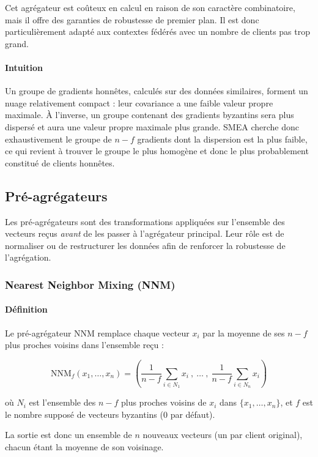 \documentclass[a4paper,11pt]{article}
\begin{document}
Cet agrégateur est coûteux en calcul en raison de son caractère combinatoire, mais il offre des garanties de robustesse de premier plan. Il est donc particulièrement adapté aux contextes fédérés avec un nombre de clients pas trop grand.

\paragraph{Intuition}

Un groupe de gradients honnêtes, calculés sur des données similaires, forment un nuage relativement compact : leur covariance a une faible valeur propre maximale. À l'inverse, un groupe contenant des gradients byzantins sera plus dispersé et aura une valeur propre maximale plus grande. SMEA cherche donc exhaustivement le groupe de $n-f$ gradients dont la dispersion est la plus faible, ce qui revient à trouver le groupe le plus homogène et donc le plus probablement constitué de clients honnêtes.

\subsection{Pré-agrégateurs}

Les pré-agrégateurs sont des transformations appliquées sur l'ensemble des vecteurs reçus \emph{avant} de les passer à l'agrégateur principal. Leur rôle est de normaliser ou de restructurer les données afin de renforcer la robustesse de l'agrégation.

\subsubsection{Nearest Neighbor Mixing (NNM)}

\paragraph{Définition}

Le pré-agrégateur NNM remplace chaque vecteur $x_i$ par la moyenne de ses $n-f$ plus proches voisins dans l'ensemble reçu :

\[
\mathrm{NNM}_f(x_1,\dots,x_n)
=
\left(
\frac{1}{n-f}\sum_{i \in N_1} x_i
\ , \ \dots \ , \
\frac{1}{n-f}\sum_{i \in N_n} x_i
\right)
\]

où $N_i$ est l'ensemble des $n-f$ plus proches voisins de $x_i$ dans $\{x_1,\dots,x_n\}$, et $f$ est le nombre supposé de vecteurs byzantins (0 par défaut).

La sortie est donc un ensemble de $n$ nouveaux vecteurs (un par client original), chacun étant la moyenne de son voisinage.
\end{document}
